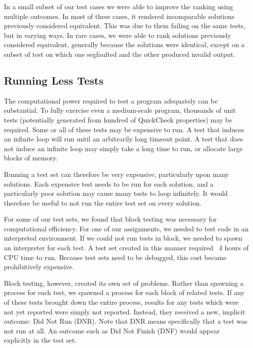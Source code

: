\documentclass[11pt,twoside]{article}
\begin{document}
In a small subset of our test cases
we were able to improve the ranking using multiple outcomes. In most of these cases, it rendered incomparable solutions previously considered equivalent. This was due to them failing on the same tests, but in varying ways. In rare cases, we were able to rank solutions previously considered equivalent, generally because the solutions were identical, except on a subset of test on which one segfaulted and the other produced invalid output.

\subsection{Running Less Tests}

The computational power required to test a program adequately can be substantial. To fully exercise even a medium-scale program, thousands of unit tests (potentially generated from hundred of QuickCheck properties) may be required. Some or all of these tests may be expensive to run. A test that induces an infinite loop will run until an arbitrarily long timeout point. A test that does not induce an infinite loop may simply take a long time to run, or allocate large blocks of memory.

Running a test set can therefore be very expensive, particularly upon many solutions. Each expensive test needs to be run for each solution, and a particularly poor solution may cause many tests to loop infinitely. It would therefore be useful to not run the entire test set on every solution. 

For some of our test sets, we found that block testing was necessary for computational efficiency. For one of our assignments, we needed to test code in an interpreted environment. If we could not run tests in block, we needed to spawn an interpreter for each test. A test set created in this manner required ~4 hours of CPU time to run. Because test sets need to be debugged, this cost became prohibitively expensive.

Block testing, however, created its own set of problems. Rather than spawning a process for each test, we spawned a process for each block of related tests. If any of these tests brought down the entire process, results for any tests which were not yet reported were simply not reported. Instead, they received a new, implicit outcome: Did Not Run (DNR). Note that DNR means specifically that a test was not run at all. An outcome such as Did Not Finish (DNF) would appear explicitly in the test set.
\end{document}
